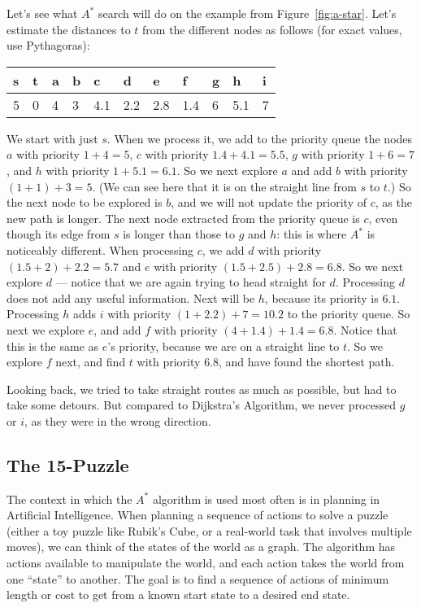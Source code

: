 Let's see what $A^*$ search will do on the example from
Figure~\ref{fig:a-star}. Let's estimate the distances to $t$ from the
different nodes as follows (for exact values, use Pythagoras): 

\begin{center}
\begin{tabular}{ l | l | l | l | l | l | l | l | l | l | l }
s & t & a & b & c & d & e & f & g & h & i \\ \hline
5 & 0 & 4 & 3 & 4.1 & 2.2 & 2.8 & 1.4 & 6 & 5.1 & 7\\ \hline
\end{tabular} 
\end{center}


We start with just $s$. When we process it, we add to the priority
queue the nodes $a$ with priority $1+4=5$, $c$ with priority $1.4+4.1
= 5.5$, $g$ with priority $1 + 6 = 7$, and $h$ with priority $1 + 5.1
= 6.1$. So we next explore $a$ and add $b$ with priority $(1+1) + 3 =
5$. (We can see here that it is on the straight line from $s$ to $t$.)
So the next node to be explored is $b$, and we will not update the
priority of $c$, as the new path is longer.
The next node extracted from the priority queue is $c$, even though
its edge from $s$ is longer than those to $g$ and $h$: this is where
$A^*$ is noticeably different.
When processing $c$, we add $d$ with priority $(1.5+2)+2.2 = 5.7$ and $e$
with priority $(1.5+2.5)+2.8 = 6.8$. 
So we next explore $d$ --- notice that we are again trying to head
straight for $d$. Processing $d$ does not add any useful information.
Next will be $h$, because its priority is $6.1$. Processing $h$ adds
$i$ with priority $(1+2.2)+7 = 10.2$ to the priority queue.
So next we explore $e$, and add $f$ with priority $(4+1.4)+1.4 =
6.8$. Notice that this is the same as $e$'s priority, because we are
on a straight line to $t$. So we explore $f$ next, and find $t$ with
priority $6.8$, and have found the shortest path.

Looking back, we tried to take straight routes as much as possible,
but had to take some detours. But compared to Dijkstra's Algorithm, we
never processed $g$ or $i$, as they were in the wrong direction. 

\subsection{The 15-Puzzle}
The context in which the $A^*$ algorithm is used most often is in
planning in Artificial Intelligence. When planning a sequence of
actions to solve a puzzle (either a toy puzzle like Rubik's Cube, or a
real-world task that involves multiple moves), we can think of the
states of the world as a graph. The algorithm has actions available to
manipulate the world, and each action takes the world from one
``state'' to another. The goal is to find a sequence of actions of
minimum length or cost to get from a known start state to a desired
end state.


